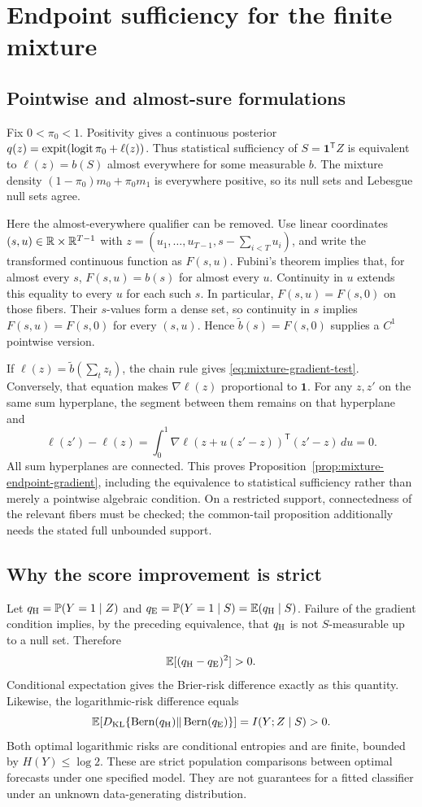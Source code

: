 \section{Endpoint sufficiency for the finite mixture}
\label{app:mixture-endpoint}

\subsection{Pointwise and almost-sure formulations}
Fix $0<\pi_0<1$. Positivity gives a continuous posterior
$q(z)=\operatorname{expit}(\operatorname{logit}\pi_0+\ell(z))$. Thus statistical sufficiency of
$S=\boldsymbol 1^{\mathsf T}Z$ is equivalent to
$\ell(z)=b(S)$ almost everywhere for some measurable $b$. The mixture density
$(1-\pi_0)m_0+\pi_0m_1$ is everywhere positive, so its null sets and Lebesgue
null sets agree.

Here the almost-everywhere qualifier can be removed. Use linear coordinates
$(s,u)\in\mathbb R\times\mathbb R^{T-1}$ with
$z=(u_1,\ldots,u_{T-1},s-\sum_{i<T}u_i)$, and write the transformed continuous
function as $F(s,u)$. Fubini's theorem implies that, for almost every $s$,
$F(s,u)=b(s)$ for almost every $u$. Continuity in $u$ extends this equality to
every $u$ for each such $s$. In particular,
$F(s,u)=F(s,0)$ on those fibers. Their $s$-values form a dense set, so continuity
in $s$ implies $F(s,u)=F(s,0)$ for every $(s,u)$. Hence
$\widetilde b(s)=F(s,0)$ supplies a $C^1$ pointwise version.

If $\ell(z)=\widetilde b(\sum_tz_t)$, the chain rule gives
\eqref{eq:mixture-gradient-test}. Conversely, that equation makes
$\nabla\ell(z)$ proportional to $\boldsymbol 1$. For any $z,z'$ on the same
sum hyperplane, the segment between them remains on that hyperplane and
\[
 \ell(z')-\ell(z)
 =\int_0^1\nabla\ell(z+u(z'-z))^{\mathsf T}(z'-z)\,du=0.
\]
All sum hyperplanes are connected. This proves
Proposition~\ref{prop:mixture-endpoint-gradient}, including the equivalence to
statistical sufficiency rather than merely a pointwise algebraic condition.
On a restricted support, connectedness of the relevant fibers must be
checked; the common-tail proposition additionally needs the stated full
unbounded support.

\subsection{Why the score improvement is strict}
Let $q_{\rm H}=\mathbb P(Y=1\mid Z)$ and
$q_{\rm E}=\mathbb P(Y=1\mid S)=\mathbb E(q_{\rm H}\mid S)$. Failure of the gradient
condition implies, by the preceding equivalence, that $q_{\rm H}$ is not
$S$-measurable up to a null set. Therefore
\[
 \mathbb E[(q_{\rm H}-q_{\rm E})^2]>0.
\]
Conditional expectation gives the Brier-risk difference exactly as this
quantity. Likewise, the logarithmic-risk difference equals
\[
 \mathbb E\!\left[
 D_{\rm KL}\{\operatorname{Bern}(q_{\rm H})
           \Vert\operatorname{Bern}(q_{\rm E})\}\right]
 = I(Y;Z\mid S)>0.
\]
Both optimal logarithmic risks are conditional entropies and are finite,
bounded by $H(Y)\leq\log2$. These are strict population comparisons between
optimal forecasts under one specified model. They are not guarantees for a
fitted classifier under an unknown data-generating distribution.

